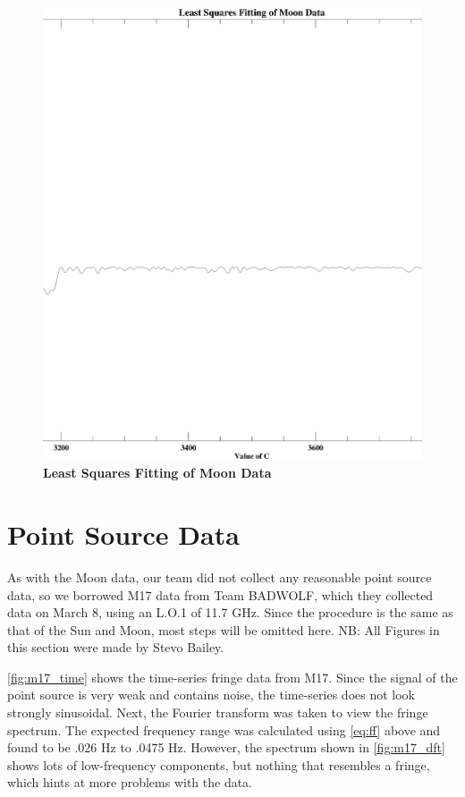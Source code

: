 \documentclass{article}
\begin{document}
\begin{figure}[h!]
 \begin{center}
    \includegraphics[width=5.5in]{moon_fit.ps}
    \caption{\bf{Least Squares Fitting of Moon Data}}
    \label{fig:ls_moon}
     \end{center}
    \end{figure}


\section{Point Source Data} 
As with the Moon data, our team did not collect any reasonable point source data, so we borrowed M17 data from Team BADWOLF, which they collected data on March 8, using an L.O.1 of 11.7 GHz. Since the procedure is the same as that of the Sun and Moon, most steps will be omitted here. NB: All Figures in this section were made by Stevo Bailey. 

\autoref{fig:m17_time} shows the time-series fringe data from M17. Since the signal of the point source is very weak and contains noise, the time-series does not look strongly sinusoidal. 
Next, the Fourier transform was taken to view the fringe spectrum. The expected frequency range was calculated using \autoref{eq:ff} above and found to be .026 Hz to .0475 Hz. However, the spectrum shown in \autoref{fig:m17_dft} shows lots of low-frequency components, but nothing that resembles a fringe, which hints at more problems with the data.
\end{document}
